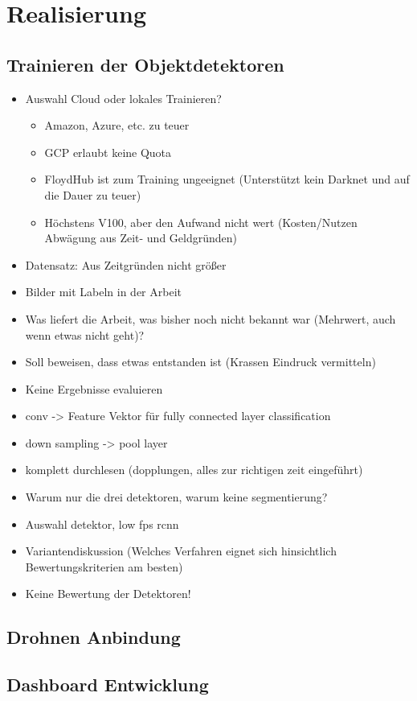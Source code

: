 \chapter{Realisierung}

\section{Trainieren der Objektdetektoren}

\begin{itemize}
	\item Auswahl Cloud oder lokales Trainieren?
	\begin{itemize}
		\item Amazon, Azure, etc. zu teuer
		\item GCP erlaubt keine Quota
		\item FloydHub ist zum Training ungeeignet (Unterstützt kein Darknet und auf die Dauer zu teuer)
		\item Höchstens V100, aber den Aufwand nicht wert (Kosten/Nutzen Abwägung aus Zeit- und Geldgründen)
	\end{itemize}
	\item Datensatz: Aus Zeitgründen nicht größer
	\item Bilder mit Labeln in der Arbeit
	\item Was liefert die Arbeit, was bisher noch nicht bekannt war (Mehrwert, auch wenn etwas nicht geht)?
	\item Soll beweisen, dass etwas entstanden ist (Krassen Eindruck vermitteln)
	\item Keine Ergebnisse evaluieren
	\item conv -> Feature Vektor für fully connected layer classification
	\item down sampling -> pool layer
	\item komplett durchlesen (dopplungen, alles zur richtigen zeit eingeführt)
	\item Warum nur die drei detektoren, warum keine segmentierung?
	\item Auswahl detektor, low fps rcnn
		\item Variantendiskussion (Welches Verfahren eignet sich hinsichtlich Bewertungskriterien am besten)
	\item Keine Bewertung der Detektoren!
\end{itemize}

\section{Drohnen Anbindung}

\section{Dashboard Entwicklung}
